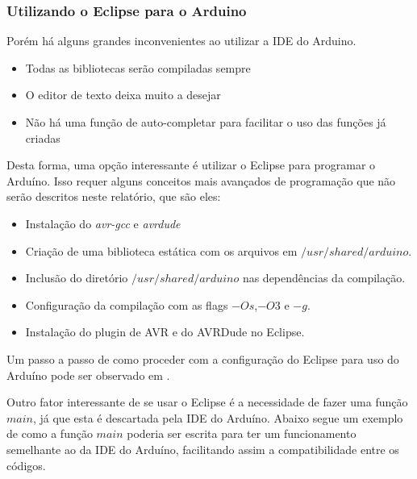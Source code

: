 \begin{multicols}{2}    %

\subsubsection{Utilizando o Eclipse para o Arduino}\label{eclipse}

Porém há alguns grandes inconvenientes ao utilizar a IDE do Arduino.

\begin{itemize}
	\item Todas as bibliotecas serão compiladas sempre
	\item O editor de texto deixa muito a desejar
	\item Não há uma função de auto-completar para facilitar o uso das funções já criadas
\end{itemize}

Desta forma, uma opção interessante é utilizar o Eclipse para programar o Arduíno. Isso requer alguns conceitos mais avançados de programação que não serão descritos neste relatório, que são eles:

\begin{itemize}
	\item Instalação do \textit{avr-gcc} e \textit{avrdude}
	\item Criação de uma biblioteca estática com os arquivos em $/usr/shared/arduino$.
	\item Inclusão do diretório $/usr/shared/arduino$ nas dependências da compilação.
	\item Configuração da compilação com as flags $-Os$,$-O3$ e $-g$.
	\item Instalação do plugin de AVR e do AVRDude no Eclipse.
\end{itemize}

Um passo a passo de como proceder com a configuração do Eclipse para uso do Arduíno pode ser observado em \cite{eclipse}.

Outro fator interessante de se usar o Eclipse é a necessidade de fazer uma função $main$, já que esta é descartada pela IDE do Arduíno. Abaixo segue um exemplo de como a função $main$ poderia ser escrita para ter um funcionamento semelhante ao da IDE do Arduíno, facilitando assim a compatibilidade entre os códigos.

\begin{lstlisting}[basicstyle=\ttfamily,numbers=none,caption={[Exemplo da função main()]Código de exemplo da função main()}]


\end{lstlisting}
\end{multicols}
